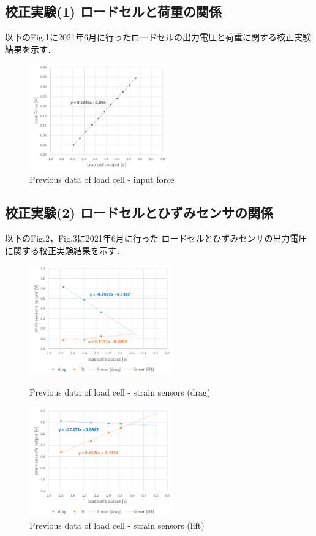 \documentclass[twocolumn,a4j]{jsarticle}
\begin{document}
\newpage

\subsection{校正実験(1) ロードセルと荷重の関係}
以下のFig.1に2021年6月に行ったロードセルの出力電圧と荷重に関する校正実験結果を示す．

\begin{figure}[htbp]
    \footnotesize
    \begin{center}
        \includegraphics[width=60mm]{../images/calibration_1.png}
        \caption{Previous data of load cell - input force}
    \end{center}
\end{figure}

\subsection{校正実験(2) ロードセルとひずみセンサの関係}
以下のFig.2，Fig.3に2021年6月に行った
ロードセルとひずみセンサの出力電圧に関する校正実験結果を示す．

\begin{figure}[htbp]
    \footnotesize
    \begin{center}
        \includegraphics[width=62mm]{../images/graph_21119_drag_previous.png}
        \caption{Previous data of load cell - strain sensors (drag)}
        \includegraphics[width=62mm]{../images/graph_21119_lift_previous.png}
        \caption{Previous data of load cell - strain sensors (lift)}
    \end{center}
\end{figure}
\end{document}
